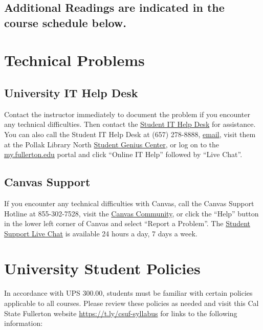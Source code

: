 \documentclass[12pt, letterpaper]{article}
\begin{document}
\subsection*{Additional Readings are indicated in the course schedule below.}


\section{Technical Problems}

\subsection*{University IT Help Desk}

Contact the instructor immediately to document the problem if you encounter any technical difficulties. Then contact the \href{http://www.fullerton.edu/it/students/helpdesk/index.php}{Student IT Help Desk} for assistance. You can also call the Student IT Help Desk at (657) 278-8888, \href{mailto:StudentITHelpDesk@fullerton.edu}{email}, visit them at the Pollak Library North \href{http://www.fullerton.edu/it/students/sgc/index.php}{Student Genius Center}, or log on to the \href{http://my.fullerton.edu/}{my.fullerton.edu} portal and click ``Online IT Help'' followed by ``Live Chat''.

\subsection*{Canvas Support}

If you encounter any technical difficulties with Canvas, call the Canvas Support Hotline at 855-302-7528, visit the \href{https://community.canvaslms.com/docs/DOC-10720-67952720329}{Canvas Community}, or click the ``Help'' button in the lower left corner of Canvas and select ``Report a Problem''. The \href{https://cases.canvaslms.com/liveagentchat?chattype=student&sfid=001A000000YzcwQIAR}{Student Support Live Chat} is available 24 hours a day, 7 days a week.


\section{University Student Policies}

In accordance with UPS 300.00, students must be familiar with certain policies applicable to all courses. Please review these policies as needed and visit this Cal State Fullerton website \href{https://t.ly/csuf-syllabus}{https://t.ly/csuf-syllabus} for links to the following information:
\end{document}
